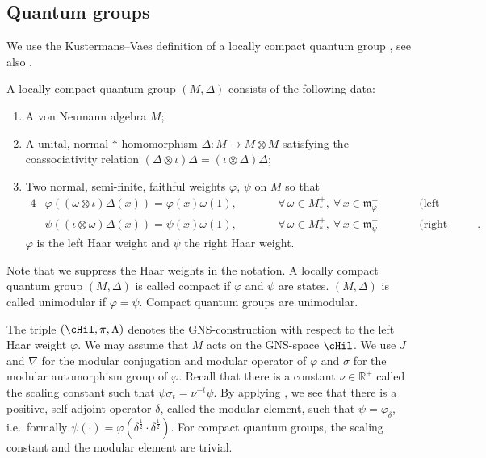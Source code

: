 \subsection*{Quantum groups}

 We use the Kustermans--Vaes def\/inition of a locally compact quantum group \cite{KusVae,KusVaeII}, see also \cite{KusLec,Tim,DaeleLcqg}.
\begin{dfn}
A locally compact quantum group $(M, \Delta)$ consists of the
following data:
\begin{enumerate}\itemsep=0pt
 \item A von Neumann algebra $M$;
\item A unital, normal $\ast$-homomorphism $\Delta: M \rightarrow M \otimes M$ satisfying the coassociativity relation $(\Delta \otimes \iota) \Delta = (\iota \otimes \Delta) \Delta$;
\item  Two  normal, semi-f\/inite, faithful weights
$\varphi$, $\psi$ on $M$ so that
\begin{alignat*}{4}
& \varphi \left( (\omega \otimes \iota )\Delta(x)\right)=
\varphi(x)\omega(1), \qquad && \forall \, \omega \in M^+_*,\  \forall\,
x\in \mathfrak{m}^+_\varphi
\qquad && \text{(left invariance);}& \\
& \psi\left( (\iota \otimes\omega)\Delta(x)\right)=
\psi(x)\omega(1), \qquad && \forall \, \omega \in M^+_*,\ \forall\,
x\in \mathfrak{m}^+_\psi \qquad && \text{(right invariance)}. &
\end{alignat*}
$\varphi$ is the left Haar weight and $\psi$ the right Haar
weight.
\end{enumerate}
\end{dfn}
\noindent Note that we suppress the Haar weights in the notation. A locally compact quantum group $(M, \Delta)$ is called compact if $\varphi$ and $\psi$ are states. $(M, \Delta)$ is called unimodular if $\varphi = \psi$. Compact quantum groups are unimodular.

 The triple $(\cHil, \pi,
\Lambda)$ denotes the GNS-construction with respect to the left
Haar weight $\varphi$. We may assume that $M$ acts on the
GNS-space $\cHil$. We use $J$ and $\nabla$ for the modular conjugation and modular operator of $\varphi$ and $\sigma$ for the modular automorphism group of $\varphi$. Recall that there is a constant $\nu \in \mathbb{R}^+$ called the scaling constant such that $\psi \sigma_t = \nu^{-t} \psi$. By applying \cite{VaeRad}, we see that there is a positive, self-adjoint operator $\delta$, called the modular element, such that $\psi = \varphi_\delta$, i.e.\ formally $\psi(\cdot) = \varphi(\delta^{\frac{1}{2}} \cdot \delta^{\frac{1}{2}} )$. For compact quantum groups, the scaling constant and the modular element are trivial.

